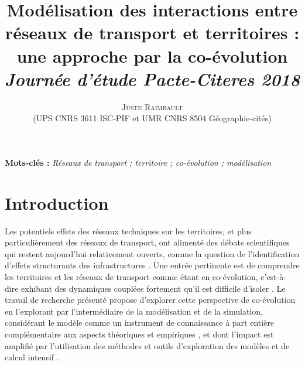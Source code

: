\documentclass[11pt]{article}
\newcommand{\noun}[1]{\textsc{#1}}
\begin{document}
\title{\vspace{-2cm}
Modélisation des interactions entre réseaux de transport et territoires : une approche par la co-évolution
\bigskip\\
\textit{Journée d'étude Pacte-Citeres 2018\\
}
}
\author{\noun{Juste Raimbault}\medskip\\
(UPS CNRS 3611 ISC-PIF et UMR CNRS 8504 Géographie-cités)\\
}
\date{}

\maketitle

\justify



\textbf{Mots-clés : }\textit{Réseaux de transport ; territoire ; co-évolution ; modélisation}

\medskip


\begin{abstract}
	
\end{abstract}




\section{Introduction}


Les potentiels effets des réseaux techniques sur les territoires, et plus particulièrement des réseaux de transport, ont alimenté des débats scientifiques qui restent aujourd'hui relativement ouverts, comme la question de l'identification d'effets structurants des infrastructures \citep{offner1993effets,espacegeo2014effets}. Une entrée pertinente est de comprendre les territoires et les réseaux de transport comme étant en co-évolution, c'est-à-dire exhibant des dynamiques couplées fortement qu'il est difficile d'isoler \citep{bretagnolle:tel-00459720}. Le travail de recherche présenté propose d'explorer cette perspective de co-évolution en l'explorant par l'intermédiaire de la modélisation et de la simulation, considérant le modèle comme un instrument de connaissance à part entière \citep{banos2013pour} complémentaire aux aspects théoriques et empiriques \citep{raimbault2017applied}, et dont l'impact est amplifié par l'utilisation des méthodes et outils d'exploration des modèles et de calcul intensif \citep{pumain2017urban}.
\end{document}
